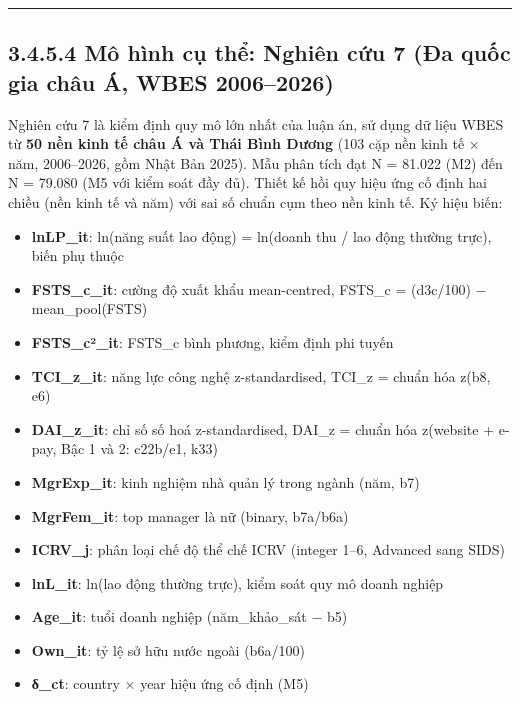 \documentclass[
  a4paper,
  13pt]{extreport}
\providecommand{\tightlist}{%
  \setlength{\itemsep}{0pt}\setlength{\parskip}{0pt}}
\begin{document}
\begin{center}\rule{0.5\linewidth}{0.5pt}\end{center}

\hypertarget{muxf4-huxecnh-cux1ee5-thux1ec3-nghiuxean-cux1ee9u-7-ux111a-quux1ed1c-gia-chuxe2u-uxe1-wbes-20062026}{%
\subsection{3.4.5.4 Mô hình cụ thể: Nghiên cứu 7 (Đa quốc gia châu Á,
WBES
2006--2026)}\label{muxf4-huxecnh-cux1ee5-thux1ec3-nghiuxean-cux1ee9u-7-ux111a-quux1ed1c-gia-chuxe2u-uxe1-wbes-20062026}}

Nghiên cứu 7 là kiểm định quy mô lớn nhất của luận án, sử dụng dữ liệu
WBES từ \textbf{50 nền kinh tế châu Á và Thái Bình Dương} (103 cặp nền
kinh tế × năm, 2006--2026, gồm Nhật Bản 2025). Mẫu phân tích đạt N =
81.022 (M2) đến N = 79.080 (M5 với kiểm soát đầy đủ). Thiết kế hồi quy
hiệu ứng cố định hai chiều (nền kinh tế và năm) với sai số chuẩn cụm
theo nền kinh tế. Ký hiệu biến:

\begin{itemize}
\tightlist
\item
  \textbf{lnLP\_it}: ln(năng suất lao động) = ln(doanh thu / lao động
  thường trực), biến phụ thuộc
\item
  \textbf{FSTS\_c\_it}: cường độ xuất khẩu mean-centred, FSTS\_c =
  (d3c/100) − mean\_pool(FSTS)
\item
  \textbf{FSTS\_c²\_it}: FSTS\_c bình phương, kiểm định phi tuyến
\item
  \textbf{TCI\_z\_it}: năng lực công nghệ z-standardised, TCI\_z = chuẩn
  hóa z(b8, e6)
\item
  \textbf{DAI\_z\_it}: chỉ số số hoá z-standardised, DAI\_z = chuẩn hóa
  z(website + e-pay, Bậc 1 và 2: c22b/e1, k33)
\item
  \textbf{MgrExp\_it}: kinh nghiệm nhà quản lý trong ngành (năm, b7)
\item
  \textbf{MgrFem\_it}: top manager là nữ (binary, b7a/b6a)
\item
  \textbf{ICRV\_j}: phân loại chế độ thể chế ICRV (integer 1--6,
  Advanced sang SIDS)
\item
  \textbf{lnL\_it}: ln(lao động thường trực), kiểm soát quy mô doanh
  nghiệp
\item
  \textbf{Age\_it}: tuổi doanh nghiệp (năm\_khảo\_sát − b5)
\item
  \textbf{Own\_it}: tỷ lệ sở hữu nước ngoài (b6a/100)
\item
  \textbf{δ\_ct}: country × year hiệu ứng cố định (M5)
\end{itemize}
\end{document}
